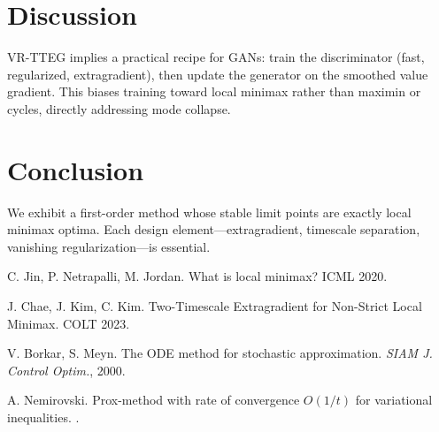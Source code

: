 \documentclass[11pt]{article}
\begin{document}
\section{Discussion}
VR-TTEG implies a practical recipe for GANs: train the discriminator (fast, regularized, extragradient), then update the generator on the smoothed value gradient. This biases training toward local minimax rather than maximin or cycles, directly addressing mode collapse.

\section{Conclusion}
We exhibit a first-order method whose stable limit points are exactly local minimax optima. Each design element---extragradient, timescale separation, vanishing regularization---is essential.

\begin{thebibliography}{9}
C. Jin, P. Netrapalli, M. Jordan.
\newblock What is local minimax? 
\newblock ICML 2020.

J. Chae, J. Kim, C. Kim.
\newblock Two-Timescale Extragradient for Non-Strict Local Minimax.
\newblock COLT 2023.

V. Borkar, S. Meyn.
\newblock The ODE method for stochastic approximation.
\newblock \emph{SIAM J. Control Optim.}, 2000.

A. Nemirovski.
\newblock Prox-method with rate of convergence $O(1/t)$ for variational inequalities.
.
\end{thebibliography}
\end{document}
